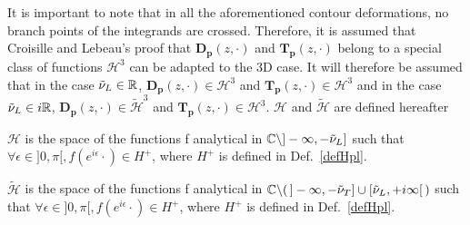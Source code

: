 It is important to note that in all the aforementioned contour deformations, no branch points of the integrands are crossed. Therefore, it is assumed that Croisille and Lebeau's \cite{CroisilleLebeau} proof that $\mathbf{D_p}(z,\cdot)$ and $\mathbf{T_p}(z,\cdot)$ belong to a special class of functions $\mathcal{H}^3$ can be adapted to the 3D case. It will therefore be assumed that in the case $\tilde{\nu}_L \in \mathbb{R}$, $\mathbf{D_p}(z,\cdot) \in \mathcal{H}^3$ and $\mathbf{T_p}(z,\cdot) \in \mathcal{H}^3$ and in the case $\tilde{\nu}_L \in i\mathbb{R}$, $\mathbf{D_p}(z,\cdot) \in \tilde{\mathcal{H}}^3$ and $\mathbf{T_p}(z,\cdot) \in \mathcal{H}^3$. $\mathcal{H}$ and $\tilde{\mathcal{H}}$ are defined hereafter
\begin{definition}
\label{C4:defH}
$\mathcal{H}$ is the space of the functions f analytical in $\mathbb{C}\backslash \rbrack -\infty,-\tilde{\nu}_L\rbrack$ such that $\forall \epsilon \in \rbrack0,\pi \lbrack, f(e^{i\epsilon} \cdot)\in H^+$, where $H^+$ is defined in Def.~\ref{defHpl}.
\end{definition}
\begin{definition}
\label{C4:defHcrit}
$\tilde{\mathcal{H}}$ is the space of the functions f analytical in  $\mathbb{C} \backslash ( \, \rbrack - \infty, -\tilde{\nu}_T \rbrack \cup \lbrack \tilde{\nu}_L,+i\infty \lbrack \,)$ such that $\forall \epsilon \in \rbrack0,\pi \lbrack, f(e^{i\epsilon} \cdot)\in H^+$, where $H^+$ is defined in Def.~\ref{defHpl}.
\end{definition}

